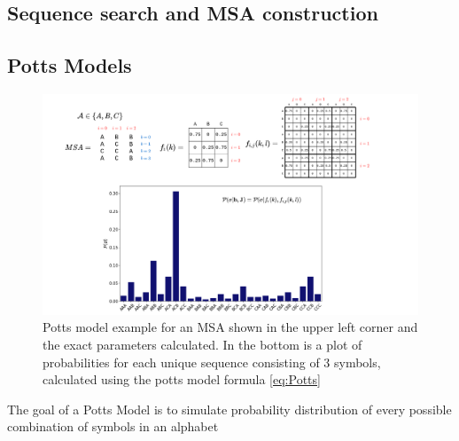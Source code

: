 \subsection{Sequence search and MSA construction}



\subsection{Potts Models}

\begin{figure}
    \centering
    \includegraphics[width=\linewidth]{imgs_tomas/potts_example.png}
    \caption{Potts model example for an MSA shown in the upper left corner and the exact parameters calculated. In the bottom is a plot of probabilities for each unique sequence consisting of 3 symbols, calculated using the potts model formula \ref{eq:Potts}}
    \label{fig:potts_example}
\end{figure}

The goal of a Potts Model is to simulate probability distribution of every possible combination of symbols in an alphabet


